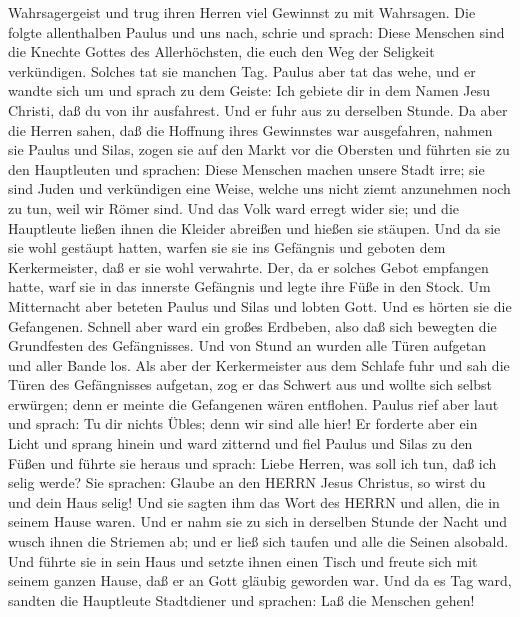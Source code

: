 Wahrsagergeist und trug ihren Herren viel Gewinnst zu mit Wahrsagen.
 Die folgte allenthalben Paulus und uns nach, schrie und
sprach: Diese Menschen sind die Knechte Gottes des Allerhöchsten, die
euch den Weg der Seligkeit verkündigen.  Solches tat sie
manchen Tag. Paulus aber tat das wehe, und er wandte sich um und sprach
zu dem Geiste: Ich gebiete dir in dem Namen Jesu Christi, daß du von ihr
ausfahrest. Und er fuhr aus zu derselben Stunde.  Da aber
die Herren sahen, daß die Hoffnung ihres Gewinnstes war ausgefahren,
nahmen sie Paulus und Silas, zogen sie auf den Markt vor die Obersten
 und führten sie zu den Hauptleuten und sprachen: Diese
Menschen machen unsere Stadt irre; sie sind Juden  und
verkündigen eine Weise, welche uns nicht ziemt anzunehmen noch zu tun,
weil wir Römer sind.  Und das Volk ward erregt wider sie;
und die Hauptleute ließen ihnen die Kleider abreißen und hießen sie
stäupen.  Und da sie sie wohl gestäupt hatten, warfen sie
sie ins Gefängnis und geboten dem Kerkermeister, daß er sie wohl
verwahrte.  Der, da er solches Gebot empfangen hatte, warf
sie in das innerste Gefängnis und legte ihre Füße in den Stock.
 Um Mitternacht aber beteten Paulus und Silas und lobten
Gott. Und es hörten sie die Gefangenen.  Schnell aber ward
ein großes Erdbeben, also daß sich bewegten die Grundfesten des
Gefängnisses. Und von Stund an wurden alle Türen aufgetan und aller
Bande los.  Als aber der Kerkermeister aus dem Schlafe fuhr
und sah die Türen des Gefängnisses aufgetan, zog er das Schwert aus und
wollte sich selbst erwürgen; denn er meinte die Gefangenen wären
entflohen.  Paulus rief aber laut und sprach: Tu dir nichts
Übles; denn wir sind alle hier!  Er forderte aber ein Licht
und sprang hinein und ward zitternd und fiel Paulus und Silas zu den
Füßen  und führte sie heraus und sprach: Liebe Herren, was
soll ich tun, daß ich selig werde?  Sie sprachen: Glaube an
den HERRN Jesus Christus, so wirst du und dein Haus selig! 
Und sie sagten ihm das Wort des HERRN und allen, die in seinem Hause
waren.  Und er nahm sie zu sich in derselben Stunde der
Nacht und wusch ihnen die Striemen ab; und er ließ sich taufen und alle
die Seinen alsobald.  Und führte sie in sein Haus und
setzte ihnen einen Tisch und freute sich mit seinem ganzen Hause, daß er
an Gott gläubig geworden war.  Und da es Tag ward, sandten
die Hauptleute Stadtdiener und sprachen: Laß die Menschen gehen!
